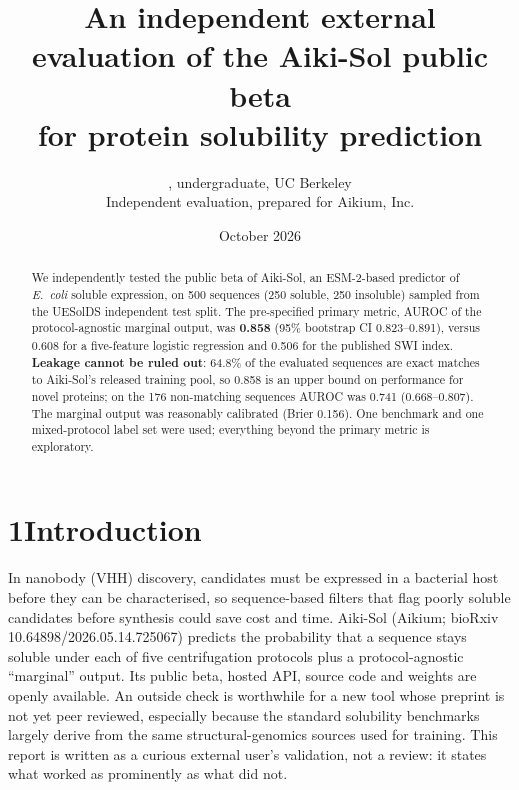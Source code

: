\documentclass[10pt]{article}
\title{\vspace{-1.2cm}\textbf{An independent external evaluation of the Aiki-Sol public beta\\ for protein solubility prediction}\vspace{-0.3cm}}
\author{\small \authorname, undergraduate, UC Berkeley\\ \small Independent evaluation, prepared for Aikium, Inc.}
\date{\small October 2026}
\begin{document}
\maketitle\vspace{-0.9cm}
\begin{abstract}\small\noindent
We independently tested the public beta of Aiki-Sol, an ESM-2-based predictor of \emph{E.~coli} soluble expression, on 500 sequences (250 soluble, 250 insoluble) sampled from the UESolDS independent test split. The pre-specified primary metric, AUROC of the protocol-agnostic marginal output, was \textbf{0.858} (95\% bootstrap CI 0.823--0.891), versus 0.608 for a five-feature logistic regression and 0.506 for the published SWI index. \textbf{Leakage cannot be ruled out}: 64.8\% of the evaluated sequences are exact matches to Aiki-Sol's released training pool, so 0.858 is an upper bound on performance for novel proteins; on the 176 non-matching sequences AUROC was 0.741 (0.668--0.807). The marginal output was reasonably calibrated (Brier 0.156). One benchmark and one mixed-protocol label set were used; everything beyond the primary metric is exploratory.
\end{abstract}
\section*{1\quad Introduction}
In nanobody (VHH) discovery, candidates must be expressed in a bacterial host before they can be characterised, so sequence-based filters that flag poorly soluble candidates before synthesis could save cost and time. Aiki-Sol (Aikium; bioRxiv 10.64898/2026.05.14.725067) predicts the probability that a sequence stays soluble under each of five centrifugation protocols plus a protocol-agnostic ``marginal'' output. Its public beta, hosted API, source code and weights are openly available.
An outside check is worthwhile for a new tool whose preprint is not yet peer reviewed, especially because the standard solubility benchmarks largely derive from the same structural-genomics sources used for training. This report is written as a curious external user's validation, not a review: it states what worked as prominently as what did not.
\end{document}
